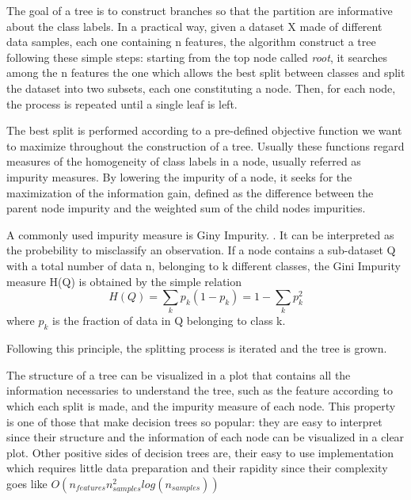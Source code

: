 \documentclass[11pt]{report}
\begin{document}
The goal of a tree is to construct branches so that the partition are informative about the class labels.
In a practical way, given a dataset X made of different data samples, each one containing n features, the algorithm construct a tree following these simple steps:
starting from the top node called \emph{root}, it searches among the n features the one which allows the best split between classes and split the dataset into two subsets, each one constituting a node. Then, for each node, the process is repeated until a single leaf is left.

The best split is performed according to a pre-defined objective function we want to maximize throughout the construction of a tree.
Usually these functions regard measures of the homogeneity of class labels in a node, usually referred as impurity measures.
By lowering the impurity of a node, it seeks for the maximization of the information gain, defined as the difference between the parent node impurity and the weighted sum of the child nodes impurities.

A commonly used impurity measure is Giny Impurity. \cite{raschka-2019}.
It can be interpreted as the probebility to misclassify an observation.
If a node contains a sub-dataset Q with a total number of data n, belonging to k different classes, the Gini Impurity measure H(Q) is obtained by the simple relation
\begin{equation}
H(Q)=\sum_k p_{k}(1-p_{k}) = 1- \sum_k p_k^2
\end{equation}
where $p_k$ is the fraction of data in Q belonging to class k.


Following this principle, the splitting process is iterated and the tree is grown.

The structure of a tree can be visualized in a plot that contains all the information necessaries to understand the tree, such as the feature according to which each split is made, and the impurity measure of each node.
This property is one of those that make decision trees so popular: they are easy to interpret since their structure and the information of each node can be visualized in a clear plot.
Other positive sides of decision trees are, their easy to use implementation which requires little data preparation and their rapidity since their complexity goes like $O(n_{features}n_{samples}^2log(n_{samples}))$ \cite{scikit-2011}
\end{document}
